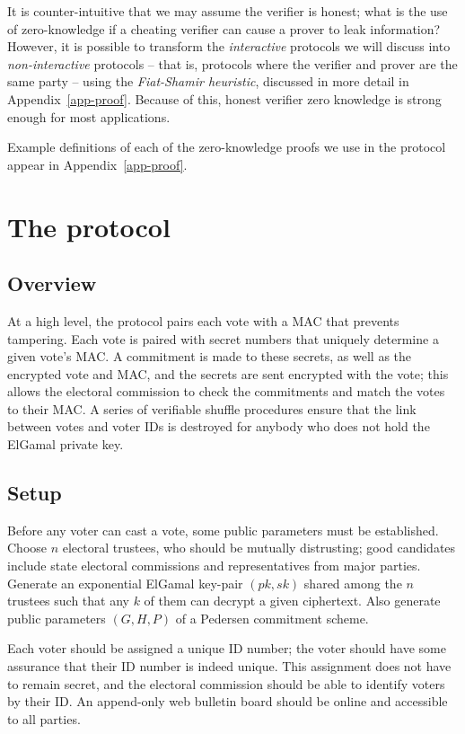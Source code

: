 \documentclass[12pt,a4paper]{article}
\theoremstyle{definition}
\begin{document}
It is counter-intuitive that we may assume the verifier is honest; what is the use of zero-knowledge if a cheating verifier can cause a prover to leak information? However, it is possible to transform the \textit{interactive} protocols we will discuss into \textit{non-interactive} protocols -- that is, protocols where the verifier and prover are the same party -- using the \textit{Fiat-Shamir heuristic}, discussed in more detail in Appendix~\ref{app-proof}. Because of this, honest verifier zero knowledge is strong enough for most applications.

Example definitions of each of the zero-knowledge proofs we use in the protocol appear in Appendix~\ref{app-proof}.

\section{The protocol}\label{sec-protocol}
\subsection{Overview}
At a high level, the protocol pairs each vote with a MAC that prevents tampering. Each vote is paired with secret numbers that uniquely determine a given vote's MAC. A commitment is made to these secrets, as well as the encrypted vote and MAC, and the secrets are sent encrypted with the vote; this allows the electoral commission to check the commitments and match the votes to their MAC. A series of verifiable shuffle procedures ensure that the link between votes and voter IDs is destroyed for anybody who does not hold the ElGamal private key.
\subsection{Setup}
Before any voter can cast a vote, some public parameters must be established. Choose $n$ electoral trustees, who should be mutually distrusting; good candidates include state electoral commissions and representatives from major parties. Generate an exponential ElGamal key-pair $(pk, sk)$ shared among the $n$ trustees such that any $k$ of them can decrypt a given ciphertext. Also generate public parameters $(G, H, P)$ of a Pedersen commitment scheme.

Each voter should be assigned a unique ID number; the voter should have some assurance that their ID number is indeed unique. This assignment does not have to remain secret, and the electoral commission should be able to identify voters by their ID. An append-only web bulletin board should be online and accessible to all parties.
\end{document}
